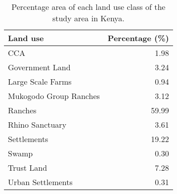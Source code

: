 \begin{table}[H]
\centering
\caption[Percentage area of each LU class, NA]{Percentage area of each land use class of the study area in Kenya.} 
\label{table:lu_percentage_NA}
\begin{tabular}{lr}
  \toprule
Land use & Percentage (\%) \\ 
  \midrule
CCA & 1.98 \\ 
  Government Land & 3.24 \\ 
  Large Scale Farms & 0.94 \\ 
  Mukogodo Group Ranches & 3.12 \\ 
  Ranches & 59.99 \\ 
  Rhino Sanctuary & 3.61 \\ 
  Settlements & 19.22 \\ 
  Swamp & 0.30 \\ 
  Trust Land & 7.28 \\ 
  Urban Settlements & 0.31 \\ 
   \bottomrule
\end{tabular}
\end{table}
